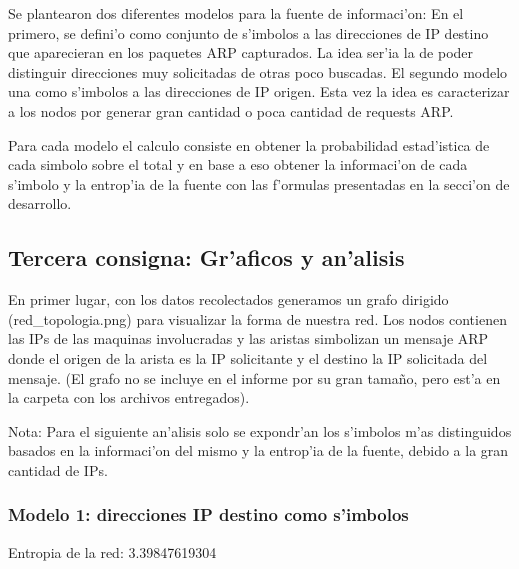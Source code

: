 \documentclass[a4paper,10pt]{article}
\begin{document}
\vspace*{5 mm}

Se plantearon dos diferentes modelos para la fuente de informaci'on: En el primero, se defini'o como conjunto de s'imbolos a las direcciones de IP destino que aparecieran en los paquetes ARP capturados. La idea ser'ia la de poder distinguir direcciones muy solicitadas de otras poco buscadas. El segundo modelo una como s'imbolos a las direcciones de IP origen. Esta vez la idea es caracterizar a los nodos por generar gran cantidad o poca cantidad de requests ARP.

\vspace*{5 mm}

Para cada modelo el calculo consiste en obtener la probabilidad estad'istica de cada simbolo sobre el total y en base a eso obtener la informaci'on de cada s'imbolo y la entrop'ia de la fuente con las f'ormulas presentadas en la secci'on de desarrollo.

\subsection{Tercera consigna: Gr'aficos y an'alisis}
\label{expli1:}

En primer lugar, con los datos recolectados generamos un grafo dirigido (red\_topologia.png) para visualizar la forma de nuestra red. Los nodos contienen las IPs de las maquinas involucradas y las aristas simbolizan un mensaje ARP donde el origen de la arista es la IP solicitante y el destino la IP solicitada del mensaje. (El grafo no se incluye en el informe por su gran tama\~no, pero est'a en la carpeta con los archivos entregados).

Nota: Para el siguiente an'alisis solo se expondr'an los s'imbolos m'as distinguidos basados en la informaci'on del mismo y la entrop'ia de la fuente, debido a la gran cantidad de IPs. \\

\subsubsection{Modelo 1: direcciones IP destino como s'imbolos}

Entropia de la red: 3.39847619304	\\
\end{document}
